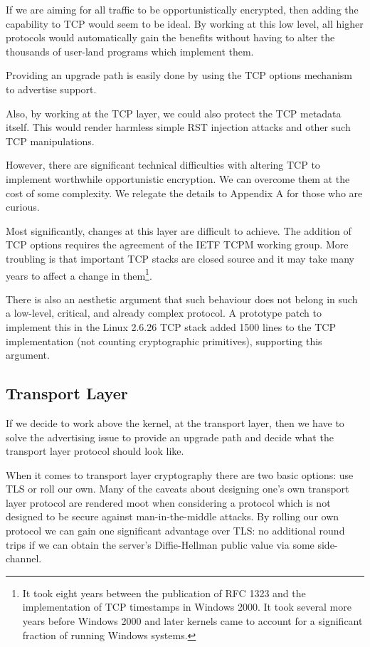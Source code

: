 \documentclass[conference]{IEEEtran}
\begin{document}
If we are aiming for all traffic to be opportunistically encrypted, then adding
the capability to TCP would seem to be ideal. By working at this low level, all
higher protocols would automatically gain the benefits without having to alter
the thousands of user-land programs which implement them.

Providing an upgrade path is easily done by using the TCP options mechanism to
advertise support.

Also, by working at the TCP layer, we could also protect the TCP metadata
itself. This would render harmless simple RST injection attacks\cite{comcast}
and other such TCP manipulations.

However, there are significant technical difficulties with altering TCP to
implement worthwhile opportunistic encryption. We can overcome them at the cost
of some complexity. We relegate the details to Appendix A for those who are
curious.

Most significantly, changes at this layer are difficult to achieve. The
addition of TCP options requires the agreement of the IETF TCPM working group.
More troubling is that important TCP stacks are closed source and it may take
many years to affect a change in them\footnote{It took eight years between the
publication of RFC 1323 and the implementation of TCP timestamps in Windows
2000. It took several more years before Windows 2000 and later kernels came to
account for a significant fraction of running Windows systems.}.

There is also an aesthetic argument that such behaviour does not belong in such
a low-level, critical, and already complex protocol. A prototype patch to
implement this in the Linux 2.6.26 TCP stack added 1500 lines to the TCP
implementation (not counting cryptographic primitives), supporting this
argument.

\subsection{Transport Layer}

If we decide to work above the kernel, at the transport layer, then we have to
solve the advertising issue to provide an upgrade path and decide what the
transport layer protocol should look like.

When it comes to transport layer cryptography there are two basic options: use
TLS or roll our own. Many of the caveats about designing one's own transport
layer protocol are rendered moot when considering a protocol which is not
designed to be secure against man-in-the-middle attacks. By rolling our own
protocol we can gain one significant advantage over TLS: no additional round
trips if we can obtain the server's Diffie-Hellman public value via some
side-channel.
\end{document}
